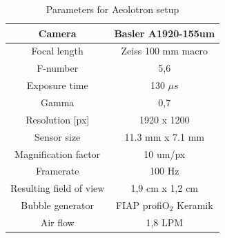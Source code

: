 		\begin{table}
			\centering
		
			\begin{tabular}{|c|c|}
			\hline 
			Camera & Basler A1920-155um \\ 
			\hline 
			Focal length & Zeiss 100 mm macro\\ 
			\hline 
			F-number & 5,6 \\ 
			\hline 
			Exposure time & 130 $\mu s$ \\ 
			\hline 
			Gamma & 0,7 \\
			\hline
			Resolution [px] &1920 x 1200 \\
			\hline 
			Sensor size & 11.3 mm x 7.1 mm \\
			\hline 
			Magnification factor & 10 um/px \\ 
			\hline 
			Framerate & 100 Hz \\ 
			\hline 
			Resulting field of view & 1,9 cm x 1,2 cm \\
			\hline
			Bubble generator & FIAP profiO$_2$ Keramik\\			
			\hline
			Air flow & 1,8 LPM  \\ 
			\hline
			\end{tabular} 
			
			\caption{Parameters for Aeolotron setup}
			\label{tab:aeolotron_setup}

		\end{table}
		
